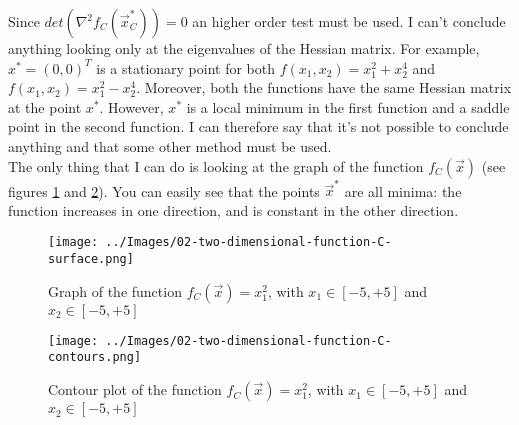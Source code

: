     Since \(det(\nabla^2 f_C(\vec{x}_C^*)) = 0\) an higher order test must be used. I can't conclude anything looking only at the eigenvalues of the Hessian matrix. For example, \(x^* = (0, 0)^T\) is a stationary point for both \(f(x_1, x_2) = x_1^2 + x_2^4\) and \(f(x_1, x_2) = x_1^2 - x_2^4\). Moreover, both the functions have the same Hessian matrix at the point \(x^*\). However, \(x^*\) is a local minimum in the first function and a saddle point in the second function. I can therefore say that it's not possible to conclude anything and that some other method must be used.\\
    The only thing that I can do is looking at the graph of the function \(f_C(\vec{x})\) (see figures \ref{two-dimensional-function-C-surface} and \ref{two-dimensional-function-C-contours}). You can easily see that the points \(\vec{x}^*\) are all minima: the function increases in one direction, and is constant in the other direction.
    \begin{figure}
        \centering
        \texttt{[image: ../Images/02-two-dimensional-function-C-surface.png]}
        \caption{Graph of the function \(f_C(\vec{x}) = x_{1}^{2}\), with \(x_1 \in [-5, +5]\) and \(x_2 \in [-5, +5]\)}
        \label{two-dimensional-function-C-surface}
    \end{figure}
    \begin{figure}
        \centering
        \texttt{[image: ../Images/02-two-dimensional-function-C-contours.png]}
        \caption{Contour plot of the function \(f_C(\vec{x}) = x_{1}^{2}\), with \(x_1 \in [-5, +5]\) and \(x_2 \in [-5, +5]\)}
        \label{two-dimensional-function-C-contours}
    \end{figure}